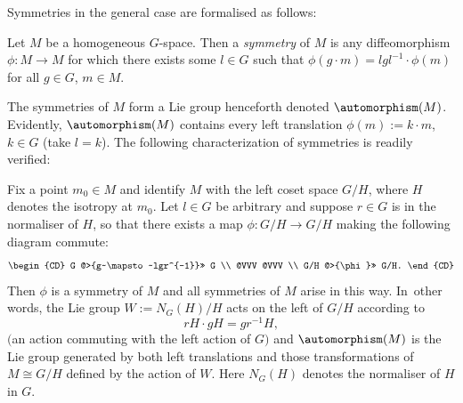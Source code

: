 Symmetries in the general case are formalised as follows:
\begin{Definition}\label{symmetriesD}
 Let $M$ be a homogeneous $G$-space. Then a {\it symmetry} of $M$ is
 any diffeomorphism $\phi \colon M \rightarrow M$ for which there
 exists some $l \in G$ such that
 $\phi(g \cdot m) = lgl^{-1} \cdot \phi(m)$ for all
 $g \in G$, $m \in M$.
\end{Definition}

 The symmetries of $M$ form a Lie group henceforth denoted
$\automorphism(M)$. Evidently, $\automorphism(M)$ contains every left
translation $\phi(m):=k \cdot m$, $k \in G$ (take $l=k$). The
following characterization of symmetries is readily verified:

\begin{Proposition}\label{symmetriesP}
 Fix a point $m_0 \in M$ and identify $M$ with the left coset space
 $G/H$, where $H$ denotes the isotropy at $m_0$. Let $l \in G$ be
 arbitrary and suppose $r \in G$ is in the normaliser of $H$, so that
 there exists a map $\phi \colon G/H \rightarrow G/H$ making the
 following diagram commute:
 \begin{equation*}
 \begin{CD} G @>{g~\mapsto~lgr^{-1}}>> G \\ @VVV @VVV \\ G/H
@>{\phi}>> G/H.
 \end{CD}
 \end{equation*}
 Then $\phi $ is a symmetry of $M$ and all
symmetries of $M$ arise in this way. In~other words, the Lie group
$W:=N_G(H)/H$ acts on the left of $G/H$ according to
\[
rH \cdot gH = gr^{-1}H,
\]
$($an action commuting with the left action of $G)$ and
$\automorphism(M)$ is the Lie group generated by both left
translations and those transformations of $M \cong G/H$ defined by the
action of $W$. Here $N_G(H)$ denotes the normaliser of $H $ in $G$.
\end{Proposition}
